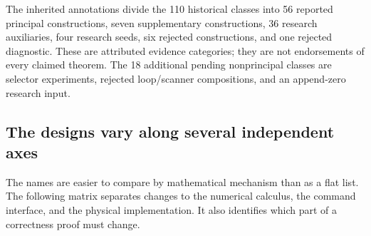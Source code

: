 The inherited annotations divide the 110 historical classes into 56
reported principal constructions, seven supplementary constructions,
36 research auxiliaries, four research seeds, six rejected constructions,
and one rejected diagnostic. These are attributed evidence categories;
they are not endorsements of every claimed theorem. The 18 additional
pending nonprincipal classes are selector experiments, rejected loop/scanner
compositions, and an append-zero research input.

\subsection{The designs vary along several independent axes}

The names are easier to compare by mathematical mechanism than as a flat
list. The following matrix separates changes to the numerical calculus,
the command interface, and the physical implementation. It also identifies
which part of a correctness proof must change.


